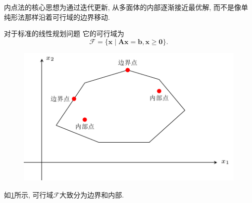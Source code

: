 内点法的核心思想为通过迭代更新, 从多面体的内部逐渐接近最优解, 而不是像单纯形法那样沿着可行域的边界移动.

对于标准的线性规划问题
它的可行域为
\begin{equation*}
    \mathcal{F}=\{\bm{x} \mid \bm{Ax}=\bm{b}, \bm{x}\geq\bm{0}\}.
\end{equation*}

\begin{figure}[ht]
    \centering
    \includegraphics[scale=1.1]{figures/17-1.pdf}
    \caption{}
    \label{figure:17-1}
\end{figure}
如\cref{figure:17-1}所示, 可行域$\mathcal{F}$大致分为边界和内部.

